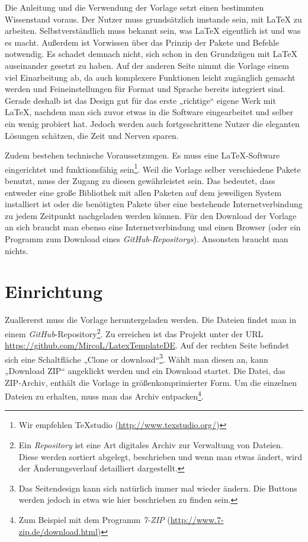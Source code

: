 			Die Anleitung und die Verwendung der Vorlage setzt einen bestimmten Wissenstand voraus. Der Nutzer muss grundsätzlich imstande sein, mit \LaTeX{} zu arbeiten. Selbstverständlich muss bekannt sein, was \LaTeX{} eigentlich ist und was es macht. Außerdem ist Vorwissen über das Prinzip der Pakete und Befehle notwendig. Es schadet demnach nicht, sich schon in den Grundzügen mit \LaTeX{} auseinander gesetzt zu haben. Auf der anderen Seite nimmt die Vorlage einem viel Einarbeitung ab, da auch komplexere Funktionen leicht zugänglich gemacht werden und Feineinstellungen für Format und Sprache bereits integriert sind. Gerade deshalb ist das Design gut für das erste „richtige“ eigene Werk mit \LaTeX{}, nachdem man sich zuvor etwas in die Software eingearbeitet und selber ein wenig probiert hat. Jedoch werden auch fortgeschrittene Nutzer die eleganten Lösungen schätzen, die Zeit und Nerven sparen.

			Zudem bestehen technische Voraussetzungen. Es muss eine \LaTeX{}-Software eingerichtet und funktionsfähig sein\footnote{Wir empfehlen TeXstudio (\url{http://www.texstudio.org/})}. Weil die Vorlage selber verschiedene Pakete benutzt, muss der Zugang zu diesen gewährleistet sein. Das bedeutet, dass entweder eine große Bibliothek mit allen Paketen auf dem jeweiligen System installiert ist oder die benötigten Pakete über eine bestehende Internetverbindung zu jedem Zeitpunkt nachgeladen werden können. Für den Download der Vorlage an sich braucht man ebenso eine Internetverbindung und einen Browser (oder ein Programm zum Download eines \emph{GitHub-Repositorys}). Ansonsten braucht man nichts.

		\section{Einrichtung}

			Zuallererst muss die Vorlage heruntergeladen werden. Die Dateien findet man in einem \emph{GitHub}-Repository\footnote{Ein \emph{Repository} ist eine Art digitales Archiv zur Verwaltung von Dateien. Diese werden sortiert abgelegt, beschrieben und wenn man etwas ändert, wird der Änderungsverlauf detailliert dargestellt.}. Zu erreichen ist das Projekt unter der URL \url{https://github.com/MircoL/LatexTemplateDE}. Auf der rechten Seite befindet sich eine Schaltfläche „Clone or download“\footnote{Das Seitendesign kann sich natürlich immer mal wieder ändern. Die Buttons werden jedoch in etwa wie hier beschrieben zu finden sein.}. Wählt man diesen an, kann „Download ZIP“ angeklickt werden und ein Download startet. Die Datei, das ZIP-Archiv, enthält die Vorlage in größenkomprimierter Form. Um die einzelnen Dateien zu erhalten, muss man das Archiv entpacken\footnote{Zum Beispiel mit dem Programm \emph{7-ZIP} (\url{http://www.7-zip.de/download.html})}.

